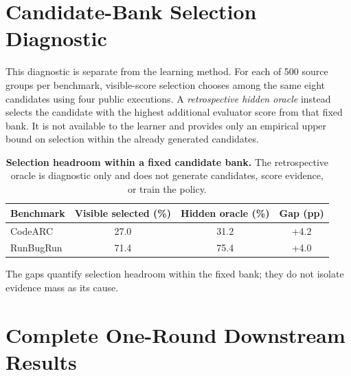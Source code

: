 \documentclass{article}
\begin{document}
\section{Candidate-Bank Selection Diagnostic}
\label{app:candidate-bank}

This diagnostic is separate from the learning method. For each of 500 source groups per benchmark, visible-score selection chooses among the same eight candidates using four public executions. A \emph{retrospective hidden oracle} instead selects the candidate with the highest additional evaluator score from that fixed bank. It is not available to the learner and provides only an empirical upper bound on selection within the already generated candidates.

\begin{table}[htbp]
\centering
\small
\caption{\textbf{Selection headroom within a fixed candidate bank.} The retrospective oracle is diagnostic only and does not generate candidates, score evidence, or train the policy.}
\setlength{\tabcolsep}{8pt}
\begin{tabular}{lccc}
\toprule
Benchmark & Visible selected (\%) & Hidden oracle (\%) & Gap (pp) \\
\midrule
CodeARC & 27.0 & 31.2 & +4.2 \\
RunBugRun & 71.4 & 75.4 & +4.0 \\
\bottomrule
\end{tabular}
\label{tab:bank-headroom}
\end{table}

The gaps quantify selection headroom within the fixed bank; they do not isolate evidence mass as its cause.

\section{Complete One-Round Downstream Results}
\label{app:full-matrix}
\end{document}
